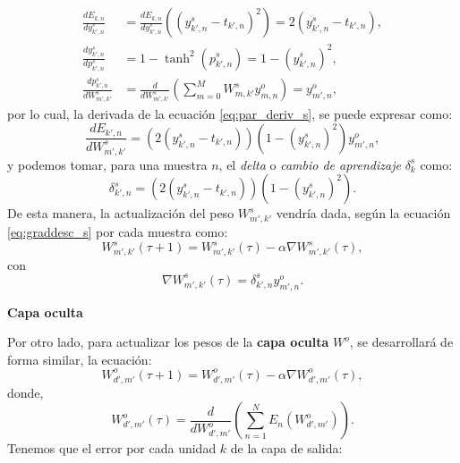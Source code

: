 \documentclass{article}
\begin{document}
\begin{align}
    \frac{dE_{k,n}}{dy_{k',n}^s} &= \frac{dE_{k,n}}{dy_{k',n}^s}\left( (y_{k',n}^s - t_{k',n})^2 \right) = 2(y_{k',n}^s - t_{k',n}), \\
    \frac{dy_{k',n}^s}{dp_{k',n}^s} &= 1 - \tanh^2(p_{k',n}^s) = 1 - (y_{k',n}^s)^2, \\
    \frac{dp_{k',n}^s}{dW_{m',k'}^s} &= \frac{d}{dW_{m',k'}^s} \left( \sum_{m=0}^{M} W_{m,k'}^s y_{m,n}^o \right) = y_{m',n}^o,
\end{align}
\noindent
por lo cual, la derivada de la ecuación \ref{eq:par_deriv_s}, se puede expresar como:
\begin{equation}
    \frac{dE_{k',n}}{dW_{m',k'}^s} = \left(2(y_{k',n}^s - t_{k',n})\right) \left(1 - (y_{k',n}^s)^2\right) y_{m',n}^o, \label{eq:par_der_s_full}
\end{equation}
\noindent
y podemos tomar, para una muestra $n$, el \textit{delta} o \textit{cambio de aprendizaje} $\delta_k^s$ como:
\begin{equation}
    \delta_{k',n}^s = \left(2(y_{k',n}^s - t_{k',n})\right) \left(1 - (y_{k',n}^s)^2\right). \label{eq:delta_s_equ}
\end{equation}
\noindent
De esta manera, la actualización del peso $W_{m',k'}^s$ vendría dada, según la ecuación \ref{eq:graddesc_s} por cada muestra como:
\begin{equation}
    W_{m',k'}^s(\tau + 1) = W_{m',k'}^s(\tau) - \alpha \nabla W_{m',k'}^s(\tau), \label{eq:grad_desc_s_final}
\end{equation}
\noindent
con
\begin{equation*}
    \nabla W_{m',k'}^s(\tau) = \delta_{k',n}^{s}y_{m',n}^o.
\end{equation*}

\noindent
\textbf{Capa oculta}
\medskip

Por otro lado, para actualizar los pesos de la \textbf{capa oculta} $W^o$, se desarrollará de forma similar, la ecuación:
\begin{equation}
    W_{d',m'}^o(\tau + 1) = W_{d',m'}^o(\tau) - \alpha \nabla W_{d',m'}^o(\tau), \label{eq:graddesc_o}
\end{equation}
\noindent
donde,
\begin{equation*}
    W_{d',m'}^o(\tau) = \frac{d}{dW_{d',m'}^o}\left( \sum_{n=1}^{N}{E_n(W_{d',m'}^o)} \right).
\end{equation*}
\noindent
Tenemos que el error por cada unidad $k$ de la capa de salida:
\end{document}
